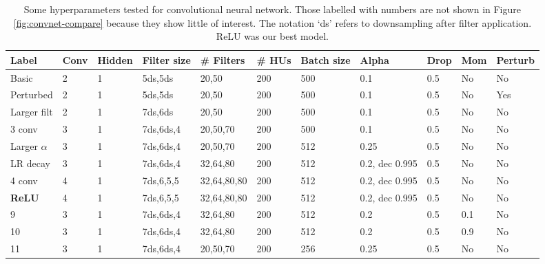 \documentclass{acm_proc_article-sp}
\begin{document}
\begin{table}[h!]
  \centering
  \begin{tabular}{|l|l|l|l|l|l|l|l|l|l|l|}
  \hline
    {\bfseries Label} & {\bfseries Conv} & {\bfseries Hidden} & {\bfseries Filter size} & {\bfseries \# Filters} & {\bfseries \# HUs} & {\bfseries Batch size} & {\bfseries Alpha} & {\bfseries Drop} & {\bfseries Mom} & {\bfseries Perturb}\\
    \hline \hline
    Basic & 2 & 1 & 5ds,5ds & 20,50 & 200 & 500 & 0.1 & 0.5 & No & No\\
    \hline
    Perturbed & 2 & 1 & 5ds,5ds & 20,50 & 200 & 500 & 0.1 & 0.5 & No & Yes\\
    \hline
    Larger filt & 2 & 1 & 7ds,6ds & 20,50 & 200 & 500 & 0.1 & 0.5 & No & No\\
    \hline
    3 conv & 3 & 1 & 7ds,6ds,4 & 20,50,70 & 200 & 500 & 0.1 & 0.5 & No & No\\
    \hline
    Larger $\alpha$ & 3 & 1 & 7ds,6ds,4 & 20,50,70 & 200 & 512 & 0.25 & 0.5 & No & No\\
    \hline
    LR decay & 3 & 1 & 7ds,6ds,4 & 32,64,80 & 200 & 512 & 0.2, dec 0.995 & 0.5 & No & No\\
    \hline
    4 conv & 4 & 1 & 7ds,6,5,5 & 32,64,80,80 & 200 & 512 & 0.2, dec 0.995 & 0.5 & No & No\\
    \hline
    {\bfseries ReLU} & 4 & 1 & 7ds,6,5,5 & 32,64,80,80 & 200 & 512 & 0.2, dec 0.995 & 0.5 & No & No\\
    \hline
    9 & 3 & 1 & 7ds,6ds,4 & 32,64,80 & 200 & 512 & 0.2 & 0.5 & 0.1 & No\\
    \hline
    10 & 3 & 1 & 7ds,6ds,4 & 32,64,80 & 200 & 512 & 0.2 & 0.5 & 0.9 & No\\
    \hline
    11 & 3 & 1 & 7ds,6ds,4 & 20,50,70 & 200 & 256 & 0.25 & 0.5 & No & No\\
    \hline
  \end{tabular}
  \caption{Some hyperparameters tested for convolutional neural network. Those labelled with numbers are not shown in Figure \ref{fig:convnet-compare} because they show little of interest. The notation `ds' refers to downsampling after filter application. ReLU was our best model.}
  \label{tab:convnet-params}
\end{table}



\balancecolumns
\end{document}
